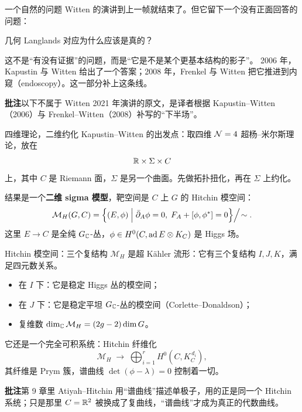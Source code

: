 
\begin{frame}{一个自然的问题}
  Witten 的演讲到上一帧就结束了。但它留下一个没有正面回答的问题：
  \vspace{0.5em}
  \begin{center}
  \large 几何 Langlands 对应为什么应该是真的？
  \end{center}
  \vspace{0.5em}
  这不是“有没有证据”的问题，而是“它是不是某个更基本结构的影子”。
  2006 年，Kapustin 与 Witten 给出了一个答案；2008 年，Frenkel 与 Witten
  把它推进到内窥（endoscopy）。这一部分补上这条线。
  \begin{beizhu}
  \textbf{批注}\quad 以下不属于 Witten 2021 年演讲的原文，是译者根据
  Kapustin--Witten（2006）与 Frenkel--Witten（2008）补写的“下半场”。
  \end{beizhu}
\end{frame}

\begin{frame}{四维理论，二维约化}
  Kapustin--Witten 的出发点：取四维 $\mathcal{N}=4$ 超杨--米尔斯理论，放在
  \[
    \mathbb{R}\times\Sigma\times C
  \]
  上，其中 $C$ 是 Riemann 面，$\Sigma$ 是另一个曲面。先做拓扑扭化，再在 $\Sigma$ 上约化。
  \vspace{0.4em}

  结果是一个\textbf{二维 sigma 模型}，靶空间是 $C$ 上 $G$ 的 Hitchin 模空间：
  \[
    \mathcal M_H(G,C)=\Bigl\{(E,\phi)\;\Big|\;
    \bar\partial_A\phi=0,\; F_A+[\phi,\phi^*]=0\Bigr\}\Big/\!\sim .
  \]
  这里 $E\to C$ 是全纯 $G_{\mathbb{C}}$-丛，$\phi\in H^0(C,\operatorname{ad} E\otimes K_C)$ 是 Higgs 场。
\end{frame}

\begin{frame}{Hitchin 模空间：三个复结构}
  $\mathcal M_H$ 是超 Kähler 流形：它有三个复结构 $I,J,K$，满足四元数关系。
  \begin{itemize}
    \item 在 $I$ 下：它是稳定 Higgs 丛的模空间；
    \item 在 $J$ 下：它是稳定平坦 $G_{\mathbb{C}}$-丛的模空间（Corlette--Donaldson）；
    \item 复维数 $\dim_{\mathbb{C}}\mathcal M_H=(2g-2)\dim G$。
  \end{itemize}
  \vspace{0.4em}
  它还是一个完全可积系统：Hitchin 纤维化
  \[
    \mathcal M_H\;\longrightarrow\;\bigoplus_{i=1}^{r}H^0(C,K_C^{\,d_i}),
  \]
  其纤维是 Prym 簇，谱曲线 $\det(\phi-\lambda)=0$ 控制着一切。
  \begin{beizhu}
  \textbf{批注}\quad 第 9 章里 Atiyah--Hitchin 用“谱曲线”描述单极子，用的正是同一个
  Hitchin 系统；只是那里 $C=\mathbb{R}^2$ 被换成了复曲线，“谱曲线”才成为真正的代数曲线。
  \end{beizhu}
\end{frame}

